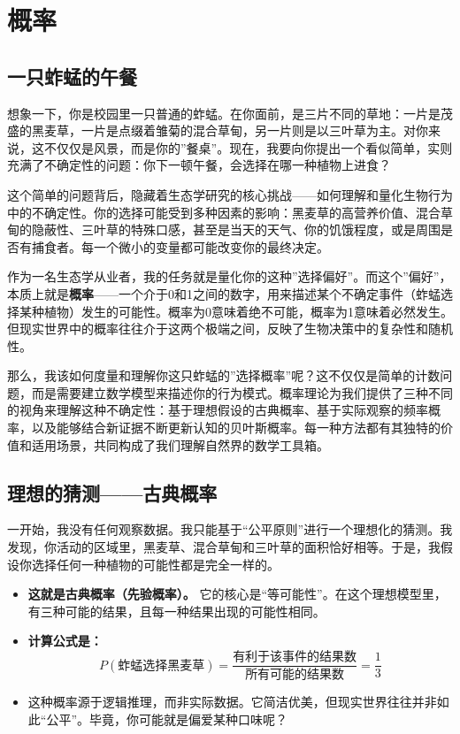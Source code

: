 \documentclass[
]{book}
\providecommand{\tightlist}{%
  \setlength{\itemsep}{0pt}\setlength{\parskip}{0pt}}
\begin{document}
\hypertarget{ux6982ux7387}{%
\section{概率}\label{ux6982ux7387}}

\hypertarget{ux4e00ux53eaux86b1ux8722ux7684ux5348ux9910}{%
\subsection{一只蚱蜢的午餐}\label{ux4e00ux53eaux86b1ux8722ux7684ux5348ux9910}}

想象一下，你是校园里一只普通的蚱蜢。在你面前，是三片不同的草地：一片是茂盛的黑麦草，一片是点缀着雏菊的混合草甸，另一片则是以三叶草为主。对你来说，这不仅仅是风景，而是你的''餐桌''。现在，我要向你提出一个看似简单，实则充满了不确定性的问题：你下一顿午餐，会选择在哪一种植物上进食？

这个简单的问题背后，隐藏着生态学研究的核心挑战------如何理解和量化生物行为中的不确定性。你的选择可能受到多种因素的影响：黑麦草的高营养价值、混合草甸的隐蔽性、三叶草的特殊口感，甚至是当天的天气、你的饥饿程度，或是周围是否有捕食者。每一个微小的变量都可能改变你的最终决定。

作为一名生态学从业者，我的任务就是量化你的这种''选择偏好''。而这个''偏好''，本质上就是\textbf{概率}------一个介于0和1之间的数字，用来描述某个不确定事件（蚱蜢选择某种植物）发生的可能性。概率为0意味着绝不可能，概率为1意味着必然发生。但现实世界中的概率往往介于这两个极端之间，反映了生物决策中的复杂性和随机性。

那么，我该如何度量和理解你这只蚱蜢的''选择概率''呢？这不仅仅是简单的计数问题，而是需要建立数学模型来描述你的行为模式。概率理论为我们提供了三种不同的视角来理解这种不确定性：基于理想假设的古典概率、基于实际观察的频率概率，以及能够结合新证据不断更新认知的贝叶斯概率。每一种方法都有其独特的价值和适用场景，共同构成了我们理解自然界的数学工具箱。

\hypertarget{ux7406ux60f3ux7684ux731cux6d4bux53e4ux5178ux6982ux7387}{%
\subsection{理想的猜测------古典概率}\label{ux7406ux60f3ux7684ux731cux6d4bux53e4ux5178ux6982ux7387}}

一开始，我没有任何观察数据。我只能基于``公平原则''进行一个理想化的猜测。我发现，你活动的区域里，黑麦草、混合草甸和三叶草的面积恰好相等。于是，我假设你选择任何一种植物的可能性都是完全一样的。

\begin{itemize}
\tightlist
\item
  \textbf{这就是古典概率（先验概率）。} 它的核心是``等可能性''。在这个理想模型里，有三种可能的结果，且每一种结果出现的可能性相同。
\item
  \textbf{计算公式是：} \[P(\text{蚱蜢选择黑麦草}) = \frac{\text{有利于该事件的结果数}}{\text{所有可能的结果数}} = \frac{1}{3}\]
\item
  这种概率源于逻辑推理，而非实际数据。它简洁优美，但现实世界往往并非如此``公平''。毕竟，你可能就是偏爱某种口味呢？
\end{itemize}
\end{document}
